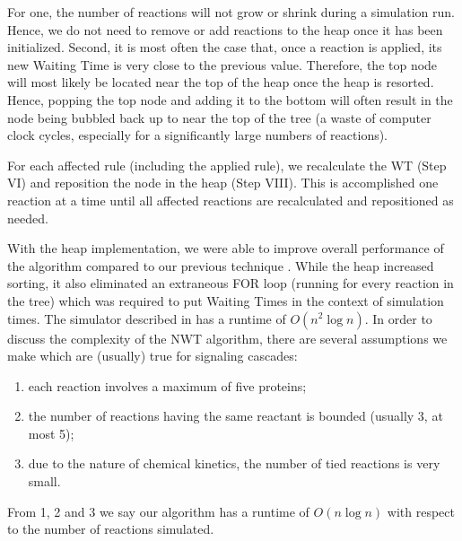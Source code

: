 \documentclass[copyright]{eptcs}
\begin{document}
For one, the number of reactions will not grow or shrink during a simulation run.  Hence, we do not need to remove or add reactions to the heap once it has been initialized.  Second, it is most often the case that, once a reaction is applied, its new Waiting Time is very close to the previous value.  Therefore, the top node will most likely be located near the top of the heap once the heap is resorted.  Hence, popping the top node and adding it to the bottom will often result in the node being bubbled back up to near the top of the tree (a waste of computer clock cycles, especially for a significantly large numbers of reactions).





For each affected rule (including the applied rule), we recalculate the WT (Step VI) and reposition the node in the heap (Step VIII).  This is accomplished one reaction at a time until all affected reactions are recalculated and repositioned as needed.









































With the heap implementation, we were able to improve overall performance of the algorithm compared to our previous technique \cite{cheruku07}.   While the heap increased sorting, it also eliminated an extraneous FOR loop (running for every reaction in the tree) which was required to put Waiting Times in the context of simulation times.  The simulator described in \cite{cheruku07} has a runtime of $O(n^2\log{n})$.  In order to discuss the complexity of the NWT algorithm, there are several assumptions we make which are (usually) true for signaling cascades:

\begin{enumerate}
\item each reaction involves a maximum of five proteins;
\item the number of reactions having the same reactant is bounded (usually 3, at most 5);
\item due to the nature of chemical kinetics, the number of tied reactions is very small.
\end{enumerate}
From 1, 2 and 3 we say our algorithm has a runtime of $O(n\log{n})$ with respect to the number of reactions simulated.
\end{document}
